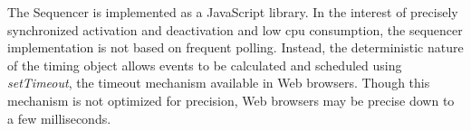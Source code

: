 The Sequencer is implemented as a JavaScript library. In the interest of
precisely synchronized activation and deactivation and low cpu consumption,
the sequencer implementation is not based on frequent polling. Instead, the
deterministic nature of the timing object allows events to be calculated and scheduled
using \emph{setTimeout}, the timeout mechanism available in Web browsers. Though this
mechanism is not optimized for precision, Web browsers may be precise down to
a few milliseconds. 







